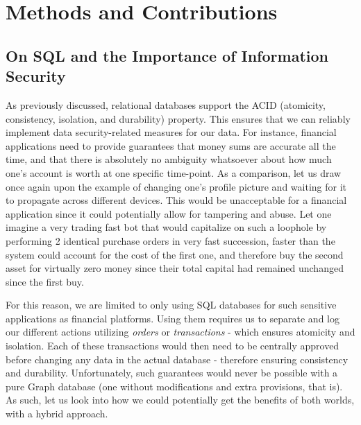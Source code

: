 \documentclass[10pt,        %
               a4paper,     %
               journal,     %
               ]{IEEEtran}
\begin{document}
\section{Methods and Contributions}
\subsection{On SQL and the Importance of Information Security}

As previously discussed, relational databases support the ACID (atomicity, consistency, isolation, and durability) property. This ensures that we can reliably implement data security-related measures for our data. For instance, financial applications need to provide guarantees that money sums are accurate all the time, and that there is absolutely no ambiguity whatsoever about how much one's account is worth at one specific time-point. As a comparison, let us draw once again upon the example of changing one's profile picture and waiting for it to propagate across different devices. This would be unacceptable for a financial application since it could potentially allow for tampering and abuse. Let one imagine a very trading fast bot that would capitalize on such a loophole by performing 2 identical purchase orders in very fast succession, faster than the system could account for the cost of the first one, and therefore buy the second asset for virtually zero money since their total capital had remained unchanged since the first buy. \par
For this reason, we are limited to only using SQL databases for such sensitive applications as financial platforms. Using them requires us to separate and log our different actions utilizing \textit{orders} or \textit{transactions} - which ensures atomicity and isolation. Each of these transactions would then need to be centrally approved before changing any data in the actual database - therefore ensuring consistency and durability. Unfortunately, such guarantees would never be possible with a pure Graph database (one without modifications and extra provisions, that is). As such, let us look into how we could potentially get the benefits of both worlds, with a hybrid approach.\par
\end{document}
